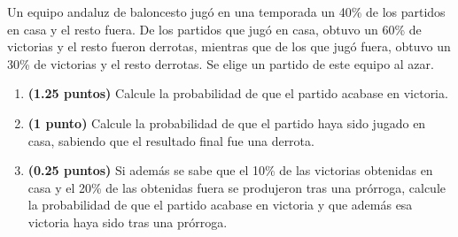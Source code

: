 
Un equipo andaluz de baloncesto jugó en una temporada un 40\% de los partidos
en casa y el resto fuera. De los partidos que jugó en casa, obtuvo un 60\% de
victorias y el resto fueron derrotas, mientras que de los que jugó fuera,
obtuvo un 30\% de victorias y el resto derrotas. Se elige un partido de este
equipo al azar.
\begin{enumerate}[label=\alph*)]
  \item \textbf{(1.25 puntos)} Calcule la probabilidad de que el partido
  acabase en victoria.
  \item \textbf{(1 punto)} Calcule la probabilidad de que el partido haya
  sido jugado en casa, sabiendo que el resultado final fue una derrota.
  \item \textbf{(0.25 puntos)} Si además se sabe que el 10\% de las victorias
  obtenidas en casa y el 20\% de las obtenidas fuera se produjeron tras una
  prórroga, calcule la probabilidad de que el partido acabase en victoria
  y que además esa victoria haya sido tras una prórroga.
\end{enumerate}

